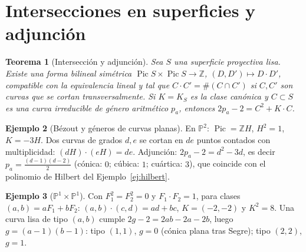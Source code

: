 \documentclass[11pt,a4paper,oneside]{book}
\newcommand{\Pic}{\operatorname{Pic}}
\newcommand{\PP}{\mathbb{P}}
\newcommand{\ZZ}{\mathbb{Z}}
\theoremstyle{plain}
\newtheorem{teorema}{Teorema}[chapter]
\theoremstyle{definition}
\newtheorem{ejemplo}[teorema]{Ejemplo}
\theoremstyle{remark}
\begin{document}
\section{Intersecciones en superficies y adjunción}

\begin{teorema}[Intersección y adjunción]
Sea $S$ una superficie proyectiva lisa. Existe una forma bilineal simétrica $\Pic S\times\Pic S\to\ZZ$, $(D,D')\mapsto D\cdot D'$, compatible con la equivalencia lineal y tal que $C\cdot C'=\#(C\cap C')$ si $C,C'$ son curvas que se cortan transversalmente. Si $K=K_S$ es la clase canónica y $C\subset S$ es una curva irreducible de género aritmético $p_a$, entonces $2p_a-2=C^2+K\cdot C$.
\end{teorema}

\begin{ejemplo}[Bézout y géneros de curvas planas]
En $\PP^2$: $\Pic=\ZZ H$, $H^2=1$, $K=-3H$. Dos curvas de grados $d,e$ se cortan en $de$ puntos contados con multiplicidad: $(dH)\cdot(eH)=de$. Adjunción: $2p_a-2=d^2-3d$, es decir $p_a=\tfrac{(d-1)(d-2)}2$ (cónica: $0$; cúbica: $1$; cuártica: $3$), que coincide con el polinomio de Hilbert del Ejemplo~\ref{ej:hilbert}.
\end{ejemplo}

\begin{ejemplo}[$\PP^1\times\PP^1$]\label{ej:p1p1}
Con $F_1^2=F_2^2=0$ y $F_1\cdot F_2=1$, para clases $(a,b)=aF_1+bF_2$: $(a,b)\cdot(c,d)=ad+bc$, $K=(-2,-2)$ y $K^2=8$. Una curva lisa de tipo $(a,b)$ cumple $2g-2=2ab-2a-2b$, luego $g=(a-1)(b-1)$: tipo $(1,1)$, $g=0$ (cónica plana tras Segre); tipo $(2,2)$, $g=1$.
\end{ejemplo}
\end{document}
